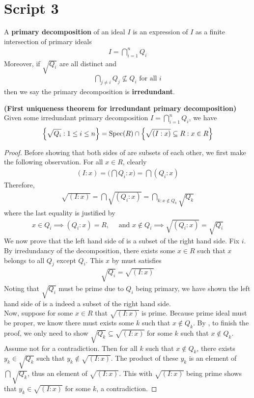 \documentclass{report}
\begin{document}
\section{Script 3}
A \textbf{primary decomposition} of an ideal $I$ is an expression of $I$ as a finite intersection of primary ideals
 \begin{align*}
I= \bigcap_{i=1}^n Q_i
\end{align*}
Moreover, if $\sqrt{Q_i}$ are all distinct and 
\begin{align*}
\bigcap_{j\neq i}Q_j \not \subseteq Q_i\text{ for all }i
\end{align*}
then we say the primary decomposition is \textbf{irredundant}. 
\begin{theorem}
\label{Fut}
\textbf{(First uniqueness theorem for irredundant primary decomposition)} Given some irredundant primary decomposition $I= \bigcap_{i=1}^n Q_i$, we have 
\begin{align}
\label{QiR}
\Big\{ \sqrt{Q_i}:1\leq i\leq n \Big\}= \operatorname{Spec}(R) \cap \Big\{ \sqrt{(I:x)} \subseteq R: x \in R  \Big\} 
\end{align}
\end{theorem}
\begin{proof}
Before showing that both sides of  are subsets of each other, we first make the following observation. For all $x \in R$, clearly 
\begin{align*}
  (I:x)= \Big(\bigcap Q_i :x\Big) = \bigcap (Q_i : x)
\end{align*}
Therefore, 
\begin{align}
\label{sIx}
\sqrt{(I:x)}= \bigcap \sqrt{(Q_i:x)}= \bigcap_{k:x \not\in Q_k} \sqrt{Q_k}  
\end{align}
where the last equality is justified by 
\begin{align*}
x \in Q_i \implies (Q_i:x)=R,\quad\text{ and } x \not\in Q_i \implies  \sqrt{(Q_i:x)} = \sqrt{Q_i} 
\end{align*}
We now prove that the left hand side of  is a subset of the right hand side. Fix $i$. By irredundancy of the decomposition, there exists some  $x\in R$ such that $x$ belongs to all $Q_j$ except  $Q_i$. This $x$ by  must satisfies
\begin{align*}
\sqrt{Q_i}  =  \sqrt{(I:x)} 
\end{align*}
Noting that $\sqrt{Q_i}$ must be prime due to $Q_i$ being primary, we have shown the left hand side of  is a indeed a subset of the right hand side. \\

Now, suppose for some $x\in R$ that $\sqrt{(I:x)}$ is prime. Because prime ideal must be proper, we know there must exists some $k$ such that $x\not \in Q_k$. By , to finish the proof, we only need to show $\sqrt{Q_k}\subseteq \sqrt{(I:x)}$ for some $k$ such that $x \not \in Q_k$. Assume not for a contradiction. Then for all $k$ such that $x \not \in Q_k$, there exists $y_k \in \sqrt{Q_k}$ such that $y_k \not \in \sqrt{(I:x)}$. The product of these $y_k$ is an element of  $\bigcap \sqrt{Q_k}$, thus an element of $\sqrt{(I:x)}$. This with $\sqrt{(I:x)}$ being prime shows that $y_k \in \sqrt{(I:x)}$ for some $k$, a contradiction. 
\end{proof}
\end{document}
